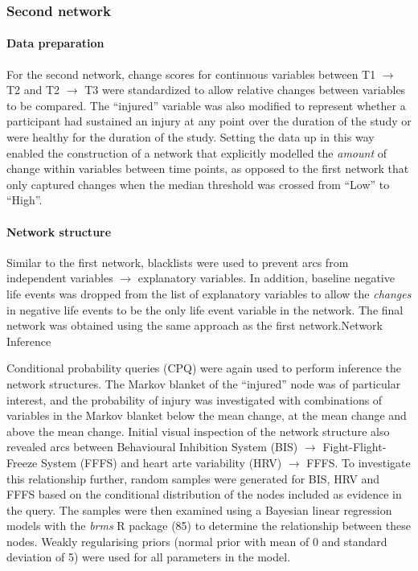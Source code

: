 \documentclass[
  english,
  man]{apa6}
\let\oldparagraph\paragraph
\renewcommand{\paragraph}[1]{\oldparagraph{#1}\mbox{}}
\begin{document}
\hypertarget{second-network}{%
\subsubsection{Second network}\label{second-network}}

\hypertarget{data-preparation-1}{%
\paragraph{Data preparation}\label{data-preparation-1}}

For the second network, change scores for continuous variables between T1 \(\rightarrow\) T2 and T2 \(\rightarrow\) T3 were standardized to allow relative changes between variables to be compared.
The ``injured'' variable was also modified to represent whether a participant had sustained an injury at any point over the duration of the study or were healthy for the duration of the study.
Setting the data up in this way enabled the construction of a network that explicitly modelled the \emph{amount} of change within variables between time points, as opposed to the first network that only captured changes when the median threshold was crossed from ``Low'' to ``High''.

\hypertarget{network-structure-1}{%
\paragraph{Network structure}\label{network-structure-1}}

Similar to the first network, blacklists were used to prevent arcs from independent variables \(\rightarrow\) explanatory variables.
In addition, baseline negative life events was dropped from the list of explanatory variables to allow the \emph{changes} in negative life events to be the only life event variable in the network.
The final network was obtained using the same approach as the first network.Network Inference

Conditional probability queries (CPQ) were again used to perform inference the network structures.
The Markov blanket of the ``injured'' node was of particular interest, and the probability of injury was investigated with combinations of variables in the Markov blanket below the mean change, at the mean change and above the mean change.
Initial visual inspection of the network structure also revealed arcs between Behavioural Inhibition System (BIS) \(\rightarrow\) Fight-Flight-Freeze System (FFFS) and heart arte variability (HRV) \(\rightarrow\) FFFS.
To investigate this relationship further, random samples were generated for BIS, HRV and FFFS based on the conditional distribution of the nodes included as evidence in the query.
The samples were then examined using a Bayesian linear regression models with the \emph{brms} R package (85) to determine the relationship between these nodes.
Weakly regularising priors (normal prior with mean of 0 and standard deviation of 5) were used for all parameters in the model.
\end{document}
